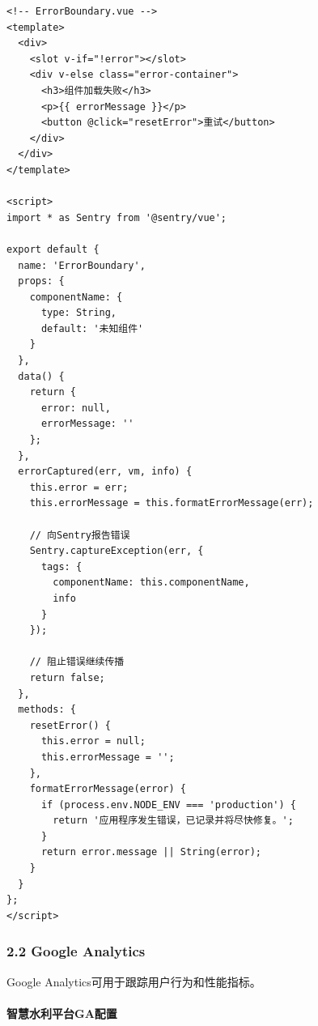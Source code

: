 \begin{lstlisting}
<!-- ErrorBoundary.vue -->
<template>
  <div>
    <slot v-if="!error"></slot>
    <div v-else class="error-container">
      <h3>组件加载失败</h3>
      <p>{{ errorMessage }}</p>
      <button @click="resetError">重试</button>
    </div>
  </div>
</template>

<script>
import * as Sentry from '@sentry/vue';

export default {
  name: 'ErrorBoundary',
  props: {
    componentName: {
      type: String,
      default: '未知组件'
    }
  },
  data() {
    return {
      error: null,
      errorMessage: ''
    };
  },
  errorCaptured(err, vm, info) {
    this.error = err;
    this.errorMessage = this.formatErrorMessage(err);
    
    // 向Sentry报告错误
    Sentry.captureException(err, {
      tags: {
        componentName: this.componentName,
        info
      }
    });
    
    // 阻止错误继续传播
    return false;
  },
  methods: {
    resetError() {
      this.error = null;
      this.errorMessage = '';
    },
    formatErrorMessage(error) {
      if (process.env.NODE_ENV === 'production') {
        return '应用程序发生错误，已记录并将尽快修复。';
      }
      return error.message || String(error);
    }
  }
};
</script>
\end{lstlisting}

\subsubsection{2.2 Google Analytics}\label{google-analytics}

Google Analytics可用于跟踪用户行为和性能指标。

\paragraph{智慧水利平台GA配置}\label{ux667aux6167ux6c34ux5229ux5e73ux53f0gaux914dux7f6e}

